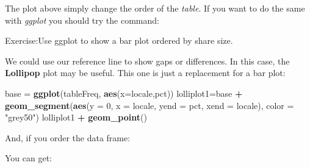 \documentclass[]{article}
\newenvironment{Shaded}{\begin{snugshade}}{\end{snugshade}}
\newcommand{\KeywordTok}[1]{\textcolor[rgb]{0.13,0.29,0.53}{\textbf{#1}}}
\newcommand{\DataTypeTok}[1]{\textcolor[rgb]{0.13,0.29,0.53}{#1}}
\newcommand{\DecValTok}[1]{\textcolor[rgb]{0.00,0.00,0.81}{#1}}
\newcommand{\StringTok}[1]{\textcolor[rgb]{0.31,0.60,0.02}{#1}}
\newcommand{\OperatorTok}[1]{\textcolor[rgb]{0.81,0.36,0.00}{\textbf{#1}}}
\newcommand{\NormalTok}[1]{#1}
\begin{document}
The plot above simply change the order of the \emph{table}. If you want
to do the same with \emph{ggplot} you should try the command:

\begin{Shaded}
\end{Shaded}

{ Exercise:Use ggplot to show a bar plot ordered by share size.}

We could use our reference line to show gaps or differences. In this
case, the \textbf{Lollipop} plot may be useful. This one is just a
replacement for a bar plot:

\begin{Shaded}
\begin{Highlighting}[]
\NormalTok{base =}\StringTok{ }\KeywordTok{ggplot}\NormalTok{(tableFreq, }\KeywordTok{aes}\NormalTok{(}\DataTypeTok{x=}\NormalTok{locale,pct)) }
\NormalTok{lolliplot1=base }\OperatorTok{+}\StringTok{ }\KeywordTok{geom_segment}\NormalTok{(}\KeywordTok{aes}\NormalTok{(}\DataTypeTok{y =} \DecValTok{0}\NormalTok{, }
                                   \DataTypeTok{x =}\NormalTok{ locale, }
                                   \DataTypeTok{yend =}\NormalTok{ pct, }
                                   \DataTypeTok{xend =}\NormalTok{ locale), }\DataTypeTok{color =} \StringTok{"grey50"}\NormalTok{) }
\NormalTok{lolliplot1 }\OperatorTok{+}\StringTok{ }\KeywordTok{geom_point}\NormalTok{()}
\end{Highlighting}
\end{Shaded}

And, if you order the data frame:

\begin{Shaded}
\end{Shaded}

You can get:
\end{document}
